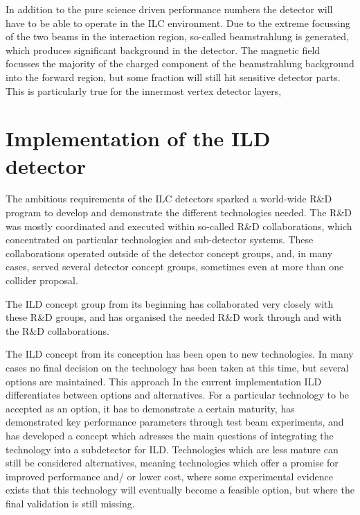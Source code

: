 \documentclass[%
 amsmath,amssymb,
 aps,
]{revtex4-1}
\begin{document}
In addition to the pure science driven performance numbers the detector will have to be able to operate in the ILC environment. Due to the extreme focussing of the two beams in the interaction region, so-called beamstrahlung is generated, which produces significant background in the detector. The magnetic field focusses the majority of the charged component of the beamstrahlung background into the forward region, but some fraction will still hit sensitive detector parts. This is particularly true for the innermost vertex detector layers, 


\section{Implementation of the ILD detector}
The ambitious requirements of the ILC detectors sparked a world-wide R\&D program to develop and demonstrate the different technologies needed. The R\&D was mostly coordinated and executed within so-called R\&D collaborations, which concentrated on particular technologies and sub-detector systems. These collaborations operated outside of the detector concept groups, and, in many cases, served several detector concept groups, sometimes even at more than one collider proposal. 

The ILD concept group from its beginning has collaborated very closely with these R\&D groups, and has organised the needed R\&D work through and with the R\&D collaborations. 

The ILD concept from its conception has been open to new technologies. 
In many cases no final decision on the technology has been taken at this time, but several options are maintained. 
This approach In the current implementation ILD differentiates between options and alternatives. 
For a particular technology to be accepted as an option, it has to demonstrate a certain maturity, has demonstrated key performance parameters through test beam experiments, and has developed a concept which adresses the main questions of integrating the technology into a subdetector for ILD. Technologies which are less mature can still be considered alternatives, meaning technologies which offer a promise for improved performance and/ or lower cost, where some experimental evidence exists that this technology will eventually become a feasible option, but where the final validation is still missing. 
\end{document}
